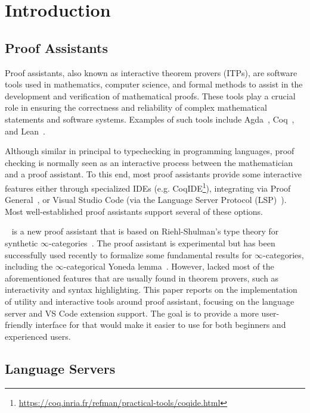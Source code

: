 \chapter{Introduction}
\label{chap:intro}

\section{Proof Assistants}

Proof assistants, also known as interactive theorem provers (ITPs),
are software tools used in mathematics, computer science, and formal methods
to assist in the development and verification of mathematical proofs.
These tools play a crucial role in ensuring the correctness and reliability
of complex mathematical statements and software systems.
Examples of such tools include Agda~\cite{BoveDybjerNorell2009}, Coq~\cite{BertotCasteran2013}, and Lean~\cite{deMouraUllrich2021}.

Although similar in principal to typechecking in programming languages,
proof checking is normally seen as an interactive process between the mathematician and a proof assistant.
To this end, most proof assistants provide some interactive features either through specialized IDEs
(e.g. CoqIDE\footnote{\url{https://coq.inria.fr/refman/practical-tools/coqide.html}}),
integrating via Proof General~\cite{Aspinall2000}, or Visual Studio Code
(via the Language Server Protocol (LSP)~\cite{Gunasinghe2022}).
Most well-established proof assistants support several of these options.

\Rzk{}~\cite{Kudasov2023-github-rzk} is a new proof assistant that is based on Riehl-Shulman's type theory for synthetic $\infty$-categories~\cite{RiehlShulman2017, Riehl2023}.
The proof assistant is experimental but has been successfully used recently to formalize some fundamental results for $\infty$-categories,
including the $\infty$-categorical Yoneda lemma~\cite{Kudasov2023}.
However, \Rzk{} lacked most of the aforementioned features that are usually found in theorem provers, such as interactivity and syntax highlighting.
This paper reports on the implementation of utility and interactive tools around \Rzk{} proof assistant, focusing on the language server and VS Code extension support.
The goal is to provide a more user-friendly interface for \Rzk{} that would make it easier to use for both beginners and experienced users.

\section{Language Servers}

